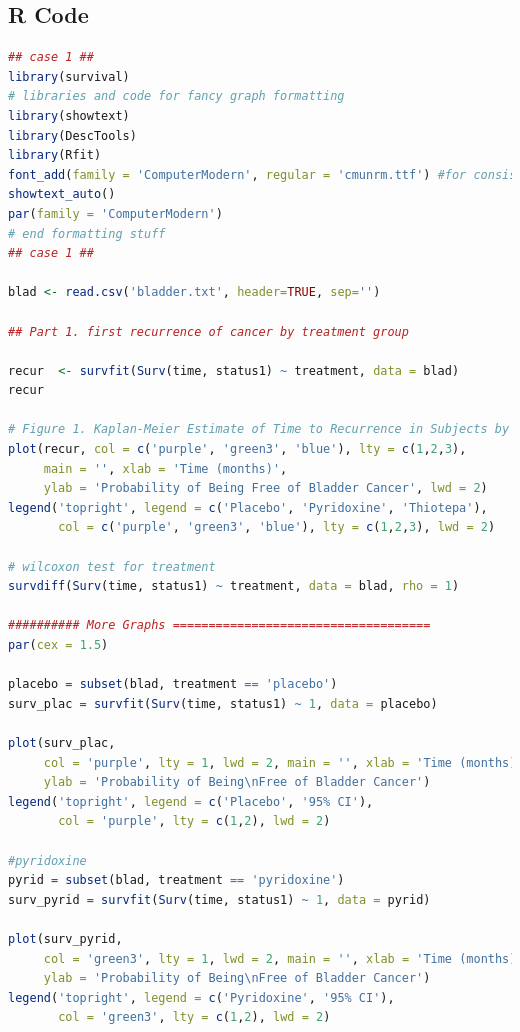 \documentclass{article}
\begin{document}
	\subsection*{R Code}

	\begin{lstlisting}[language=R,caption={Case 1: Bladder Cancer Survival Analysis},label={lst:case1}]
		## case 1 ##
library(survival)
# libraries and code for fancy graph formatting
library(showtext)
library(DescTools)
library(Rfit)
font_add(family = 'ComputerModern', regular = 'cmunrm.ttf') #for consistent formatting in LaTex
showtext_auto()
par(family = 'ComputerModern')
# end formatting stuff
## case 1 ##

blad <- read.csv('bladder.txt', header=TRUE, sep='')

## Part 1. first recurrence of cancer by treatment group

recur  <- survfit(Surv(time, status1) ~ treatment, data = blad)
recur

# Figure 1. Kaplan-Meier Estimate of Time to Recurrence in Subjects by Treatment
plot(recur, col = c('purple', 'green3', 'blue'), lty = c(1,2,3), 
     main = '', xlab = 'Time (months)',
     ylab = 'Probability of Being Free of Bladder Cancer', lwd = 2)
legend('topright', legend = c('Placebo', 'Pyridoxine', 'Thiotepa'), 
       col = c('purple', 'green3', 'blue'), lty = c(1,2,3), lwd = 2)

# wilcoxon test for treatment
survdiff(Surv(time, status1) ~ treatment, data = blad, rho = 1) 

########## More Graphs ====================================
par(cex = 1.5)

placebo = subset(blad, treatment == 'placebo')
surv_plac = survfit(Surv(time, status1) ~ 1, data = placebo)

plot(surv_plac, 
     col = 'purple', lty = 1, lwd = 2, main = '', xlab = 'Time (months)', 
     ylab = 'Probability of Being\nFree of Bladder Cancer')
legend('topright', legend = c('Placebo', '95% CI'),
       col = 'purple', lty = c(1,2), lwd = 2)

#pyridoxine
pyrid = subset(blad, treatment == 'pyridoxine')
surv_pyrid = survfit(Surv(time, status1) ~ 1, data = pyrid)

plot(surv_pyrid, 
     col = 'green3', lty = 1, lwd = 2, main = '', xlab = 'Time (months)', 
     ylab = 'Probability of Being\nFree of Bladder Cancer')
legend('topright', legend = c('Pyridoxine', '95% CI'),
       col = 'green3', lty = c(1,2), lwd = 2)


\end{lstlisting}
\end{document}
